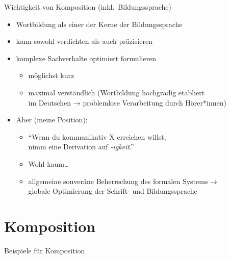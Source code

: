 \begin{frame}
  {Wichtigkeit von Komposition (inkl.\ Bildungssprache)}
  \pause
  \begin{itemize}[<+->]
    \item Wortbildung als einer der Kerne der Bildungssprache
    \item kann sowohl \alert{verdichten} als auch \alert{präzisieren}
    \Halbzeile
    \item komplexe Sachverhalte \alert{optimiert} formulieren
      \begin{itemize}[<+->]
        \item möglichst kurz
        \item maximal verständlich (Wortbildung hochgradig etabliert\\
          im Deutschen → problemlose Verarbeitung durch Hörer*innen)
      \end{itemize}
      \Halbzeile
    \item Aber (meine Position): 
      \Halbzeile
      \begin{itemize}[<+->]
        \item "`Wenn du kommunikativ X erreichen willst,\\
          nimm eine Derivation auf \textit{-igkeit}."'
        \item \alert{Wohl kaum\ldots}
        \item \alert{allgemeine souveräne Beherrschung des formalen Systems →\\
          globale Optimierung der Schrift- und Bildungssprache}
      \end{itemize}
  \end{itemize}
\end{frame}

\section{Komposition}

\begin{frame}
  {Beispiele für Komposition}
  \pause
  \begin{exe}
    \ex
    \begin{xlist}
      \pause
      \pause
      \pause
      \pause
      \pause
      \pause
      \pause
      \pause
    \end{xlist}
  \end{exe}
\end{frame}

